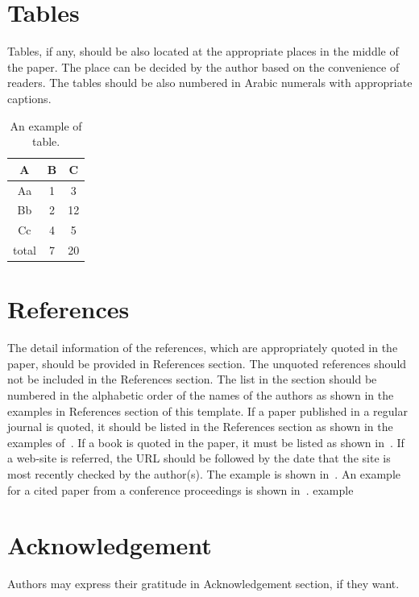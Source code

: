 \documentclass[10pt]{article}
\begin{document}
\section{Tables}
Tables, if any, should be also located at the appropriate places in the middle of the paper. The place can be decided by the author based on the convenience of readers. The tables should be also numbered in Arabic numerals with appropriate captions.
\begin{table}[htbp]
\begin{center}
\caption{An example of table.}
\vspace{2mm}
\label{tab1}
\begin{tabular}{ccc}
\hline
A & B & C \\
\hline
Aa & 1 & 3 \\
Bb & 2 & 12 \\
Cc & 4 & 5 \\
\hline
total & 7 & 20\\
\hline
\end{tabular}
\end{center}
\end{table}


\section{References}
The detail information of the references, which are appropriately
quoted in the paper, should be provided in References section. The
unquoted references should not be included in the References
section. The list in the section should be numbered in the alphabetic order
of the names of the authors as shown in the examples in References
section of this template. If a paper published in a regular journal is quoted, it should be
listed in the References section as shown in the examples
of~\cite{ref1,ref4}. If a book is quoted in the paper, it must be
listed as shown in~\cite{ref2,ref3}. If a web-site is referred,
the URL should be followed by the date that the site is most
recently checked by the author(s). The example is shown
in~\cite{ref5}. An example for a cited paper from a conference
proceedings is shown in~\cite{ref6}.
example \cite{refefe}


\section*{Acknowledgement}
Authors may express their gratitude in Acknowledgement section, if
they want.




\end{document}
